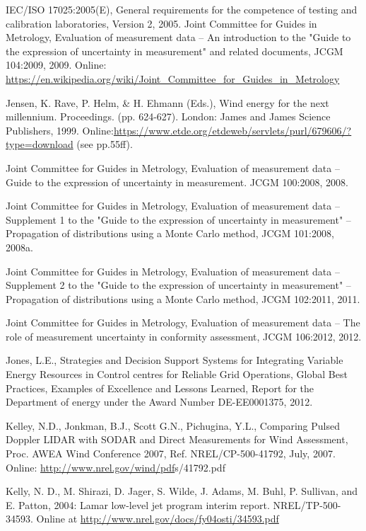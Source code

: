 {IEC/ISO 17025:2005(E), General requirements for the competence of testing and calibration laboratories, Version 2, 2005.
Joint Committee for Guides in Metrology, Evaluation of measurement data -- An introduction to the "Guide to the expression of uncertainty in measurement" and related documents, JCGM 104:2009, 2009.   
Online: \small{\url{https://en.wikipedia.org/wiki/Joint_Committee_for_Guides_in_Metrology}}

Jensen, K. Rave, P. Helm, & H. Ehmann (Eds.), Wind energy for the next millennium. Proceedings. (pp. 624-627). London: James and James Science Publishers, 1999.          
Online:\small{\url{https://www.etde.org/etdeweb/servlets/purl/679606/?type=download}}  (see pp.55ff).

Joint Committee for Guides in Metrology, Evaluation of measurement data -- Guide to the expression of uncertainty in measurement. JCGM 100:2008, 2008.


Joint Committee for Guides in Metrology, Evaluation of measurement data -- Supplement 1 to the "Guide to the expression of uncertainty in measurement" -- Propagation of distributions using a Monte Carlo method, JCGM 101:2008, 2008a.


Joint Committee for Guides in Metrology, Evaluation of measurement data -- Supplement 2 to the "Guide to the expression of uncertainty in measurement" -- Propagation of distributions using a Monte Carlo method, JCGM 102:2011, 2011.


Joint Committee for Guides in Metrology, Evaluation of measurement data -- The role of measurement uncertainty in conformity assessment, JCGM 106:2012, 2012.


Jones, L.E., Strategies and Decision Support Systems for Integrating Variable Energy Resources in Control centres for Reliable Grid Operations, Global Best Practices, Examples of Excellence and Lessons Learned, Report for the Department of energy under the Award Number DE-EE0001375, 2012.


Kelley, N.D., Jonkman, B.J., Scott G.N., Pichugina, Y.L., Comparing Pulsed Doppler LIDAR with SODAR and Direct Measurements for Wind Assessment, Proc. AWEA Wind Conference 2007, Ref. NREL/CP-500-41792, July, 2007. 
Online: \small{\url{http://www.nrel.gov/wind/pdf}s/41792.pdf}}


Kelly, N. D., M. Shirazi, D. Jager, S. Wilde, J. Adams, M. Buhl, P. Sullivan, and E. Patton, 2004: Lamar low-level jet program interim report. NREL/TP-500-34593. 
Online at \small{\url{http://www.nrel.gov/docs/fy04osti/34593.pdf}}


